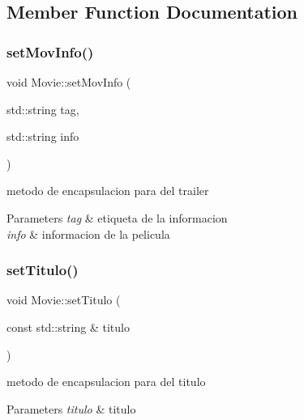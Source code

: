 \subsection{Member Function Documentation}
\mbox{\label{classMovie_a3e136a871d3272a96c057ed7fbe21d85}} 
\subsubsection{\texorpdfstring{set\+Mov\+Info()}{setMovInfo()}}
{\footnotesize\ttfamily void Movie\+::set\+Mov\+Info (\begin{DoxyParamCaption}\item[{std\+::string}]{tag,  }\item[{std\+::string}]{info }\end{DoxyParamCaption})}



metodo de encapsulacion para del trailer 


\begin{DoxyParams}{Parameters}
{\em tag} & etiqueta de la informacion \\
\hline
{\em info} & informacion de la pelicula \\
\hline
\end{DoxyParams}
\mbox{\label{classMovie_a36d6116d5f693e5a8079f99ac2cea6be}} 
\subsubsection{\texorpdfstring{set\+Titulo()}{setTitulo()}}
{\footnotesize\ttfamily void Movie\+::set\+Titulo (\begin{DoxyParamCaption}\item[{const std\+::string \&}]{titulo }\end{DoxyParamCaption})}



metodo de encapsulacion para del titulo 


\begin{DoxyParams}{Parameters}
{\em titulo} & titulo \\
\hline
\end{DoxyParams}
\mbox{\label{classMovie_a418a7d966ed0dadaf3d9725b3693091d}} 
